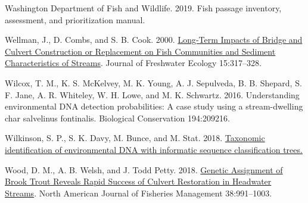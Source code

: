 \documentclass[
]{article}
\newlength{\cslhangindent}
\newlength{\cslentryspacingunit} %
\newenvironment{CSLReferences}[2] %
 {%
  \setlength{\parindent}{0pt}
  \ifodd #1
  \let\oldpar\par
  \def\par{\hangindent=\cslhangindent\oldpar}
  \fi
  \setlength{\parskip}{#2\cslentryspacingunit}
 }%
 {}
\begin{document}
\begin{CSLReferences}{1}{0}
\leavevmode{}%
Washington Department of Fish and Wildlife. 2019. Fish passage
inventory, assessment, and prioritization manual.

\leavevmode{}%
Wellman, J., D. Combs, and S. B. Cook. 2000.
\href{https://www.tandfonline.com/doi/epdf/10.1080/02705060.2000.9663750?needAccess=true\&role=button}{Long-Term
Impacts of Bridge and Culvert Construction or Replacement on Fish
Communities and Sediment Characteristics of Streams}. Journal of
Freshwater Ecology 15:317--328.

\leavevmode{}%
Wilcox, T. M., K. S. McKelvey, M. K. Young, A. J. Sepulveda, B. B.
Shepard, S. F. Jane, A. R. Whiteley, W. H. Lowe, and M. K. Schwartz.
2016. Understanding environmental DNA detection probabilities: A case
study using a stream-dwelling char salvelinus fontinalis. Biological
Conservation 194:209216.

\leavevmode{}%
Wilkinson, S. P., S. K. Davy, M. Bunce, and M. Stat. 2018.
\href{https://doi.org/10.7287/peerj.preprints.26812v1}{Taxonomic
identification of environmental DNA with informatic sequence
classification trees.}

\leavevmode{}%
Wood, D. M., A. B. Welsh, and J. Todd Petty. 2018.
\href{https://doi.org/10.1002/nafm.10185}{Genetic Assignment of Brook
Trout Reveals Rapid Success of Culvert Restoration in Headwater
Streams}. North American Journal of Fisheries Management 38:991--1003.

\end{CSLReferences}
\end{document}

